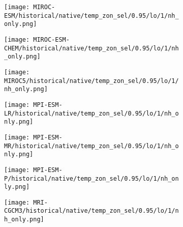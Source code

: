 \documentclass[preview]{standalone}
\begin{document}
\begin{figure}
  \begin{subfigure}[t]{\textwidth}
    \texttt{[image: MIROC-ESM/historical/native/temp\_zon\_sel/0.95/lo/1/nh\_only.png]}
  \end{subfigure}
\end{figure}

\begin{figure}
  \begin{subfigure}[t]{\textwidth}
    \texttt{[image: MIROC-ESM-CHEM/historical/native/temp\_zon\_sel/0.95/lo/1/nh\_only.png]}
  \end{subfigure}
\end{figure}

\begin{figure}
  \begin{subfigure}[t]{\textwidth}
    \texttt{[image: MIROC5/historical/native/temp\_zon\_sel/0.95/lo/1/nh\_only.png]}
  \end{subfigure}
\end{figure}

\begin{figure}
  \begin{subfigure}[t]{\textwidth}
    \texttt{[image: MPI-ESM-LR/historical/native/temp\_zon\_sel/0.95/lo/1/nh\_only.png]}
  \end{subfigure}
\end{figure}

\begin{figure}
  \begin{subfigure}[t]{\textwidth}
    \texttt{[image: MPI-ESM-MR/historical/native/temp\_zon\_sel/0.95/lo/1/nh\_only.png]}
  \end{subfigure}
\end{figure}

\begin{figure}
  \begin{subfigure}[t]{\textwidth}
    \texttt{[image: MPI-ESM-P/historical/native/temp\_zon\_sel/0.95/lo/1/nh\_only.png]}
  \end{subfigure}
\end{figure}

\begin{figure}
  \begin{subfigure}[t]{\textwidth}
    \texttt{[image: MRI-CGCM3/historical/native/temp\_zon\_sel/0.95/lo/1/nh\_only.png]}
  \end{subfigure}
\end{figure}
\end{document}

